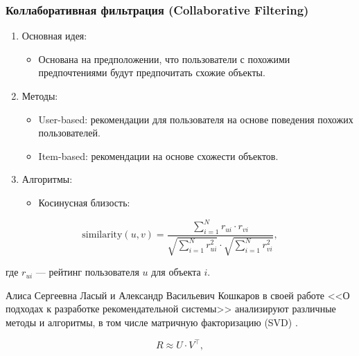 \begin{enumerate}
\hypertarget{ux43aux43eux43bux43bux430ux431ux43eux440ux430ux442ux438ux432ux43dux430ux44f-ux444ux438ux43bux44cux442ux440ux430ux446ux438ux44f-collaborative-filtering}{%
\subsubsection*{Коллаборативная фильтрация (Collaborative
Filtering)}\label{ux43aux43eux43bux43bux430ux431ux43eux440ux430ux442ux438ux432ux43dux430ux44f-ux444ux438ux43bux44cux442ux440ux430ux446ux438ux44f-collaborative-filtering}}

\begin{enumerate}
\def\labelenumi{\arabic{enumi}.}
\tightlist
\item
  Основная идея:

  \begin{itemize}
  \tightlist
  \item
    Основана на предположении, что пользователи с похожими
    предпочтениями будут предпочитать схожие объекты.
  \end{itemize}
\item
  Методы:
  \begin{itemize}
  \tightlist
  \item
    User-based: рекомендации для пользователя на основе
    поведения похожих пользователей.
  \item
    Item-based: рекомендации на основе схожести объектов.
  \end{itemize}
\item
  Алгоритмы:

  \begin{itemize}
  \tightlist
  \item
    Косинусная близость:
  \end{itemize}
\end{enumerate}

\begin{equation}
     \text{similarity}(u, v) = \frac{\sum_{i=1}^N r_{ui} \cdot r_{vi}}{\sqrt{\sum_{i=1}^N r_{ui}^2} \cdot \sqrt{\sum_{i=1}^N r_{vi}^2}},
\end{equation}

где \( r_{ui} \) --- рейтинг пользователя \( u \) для объекта \( i \). 

Алиса Сергеевна Ласый и Александр Васильевич Кошкаров в своей работе <<О подходах к разработке рекомендательной системы>> анализируют различные методы и алгоритмы, в том числе матричную факторизацию (SVD)
\cite{ласый2020подходах}.

\begin{equation}
     R \approx U \cdot V^\top,
\end{equation}


\end{enumerate}
